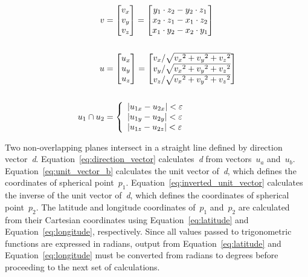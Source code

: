 \begin{figure}[ht]
	\begin{align}
		\label{eq:plane_vector}
			v & =
			\begin{bmatrix}
				v_x\\
				v_y\\
				v_z
			\end{bmatrix} =
			\begin{bmatrix}
				y_1 \cdot z_2 - y_2 \cdot z_1\\
				x_2 \cdot z_1 - x_1 \cdot z_2\\
				x_1 \cdot y_2 - x_2 \cdot y_1
			\end{bmatrix}\\
			\nonumber\\
		\label{eq:unit_vector_a}
			u & =
			\begin{bmatrix}
				u_x\\
				u_y\\
				u_z
			\end{bmatrix} =
			\begin{bmatrix}
				v_x / \sqrt{{v_x}^2 + {v_y}^2 + {v_z}^2}\\
				v_y / \sqrt{{v_x}^2 + {v_y}^2 + {v_z}^2}\\
				v_z / \sqrt{{v_x}^2 + {v_y}^2 + {v_z}^2}
			\end{bmatrix}\\
			\nonumber\\
		\label{eq:overlaping_unit_vectors}
			u_1 \cap u_2 & =
			\left\{
				\begin{array}{l}
					|u_{1x} - u_{2x}| < \varepsilon\\
					|u_{1y} - u_{2y}| < \varepsilon\\
					|u_{1z} - u_{2z}| < \varepsilon
				\end{array}
			\right.
	\end{align}
\end{figure}

Two non-overlapping planes intersect in a straight line defined by direction vector~\emph{d}. Equation~\ref{eq:direction_vector} calculates~\emph{d} from vectors~$u_a$ and~$u_b$. Equation~\ref{eq:unit_vector_b} calculates the unit vector of~\emph{d}, which defines the coordinates of spherical point~$p_1$. Equation~\ref{eq:inverted_unit_vector} calculates the inverse of the unit vector of~\emph{d}, which defines the coordinates of spherical point~$p_2$. The latitude and longitude coordinates of~$p_1$ and~$p_2$ are calculated from their Cartesian coordinates using Equation~\ref{eq:latitude} and Equation~\ref{eq:longitude}, respectively. Since all values passed to trigonometric functions are expressed in radians, output from Equation~\ref{eq:latitude} and Equation~\ref{eq:longitude} must be converted from radians to degrees before proceeding to the next set of calculations.

